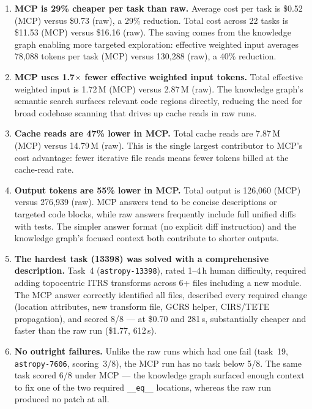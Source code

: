 \begin{enumerate}
\item \textbf{MCP is 29\% cheaper per task than raw.}
      Average cost per task is \$0.52 (MCP) versus \$0.73 (raw), a
      29\% reduction.  Total cost across 22 tasks is \$11.53 (MCP)
      versus \$16.16 (raw).  The saving comes from the knowledge graph
      enabling more targeted exploration: effective weighted input
      averages 78{,}088 tokens per task (MCP) versus 130{,}288 (raw),
      a 40\% reduction.

\item \textbf{MCP uses 1.7$\times$ fewer effective weighted input
      tokens.}
      Total effective weighted input is 1.72\,M (MCP) versus 2.87\,M
      (raw).  The knowledge graph's semantic search surfaces relevant
      code regions directly, reducing the need for broad codebase
      scanning that drives up cache reads in raw runs.

\item \textbf{Cache reads are 47\% lower in MCP.}
      Total cache reads are 7.87\,M (MCP) versus 14.79\,M (raw).
      This is the single largest contributor to MCP's cost advantage:
      fewer iterative file reads means fewer tokens billed at the
      cache-read rate.

\item \textbf{Output tokens are 55\% lower in MCP.}
      Total output is 126{,}060 (MCP) versus 276{,}939 (raw).
      MCP answers tend to be concise descriptions or targeted code
      blocks, while raw answers frequently include full unified diffs
      with tests.  The simpler answer format (no explicit diff
      instruction) and the knowledge graph's focused context both
      contribute to shorter outputs.

\item \textbf{The hardest task (13398) was solved with a comprehensive
      description.}
      Task~4 (\texttt{astropy-13398}), rated 1--4\,h human difficulty,
      required adding topocentric ITRS transforms across 6+ files
      including a new module.  The MCP answer correctly identified all
      files, described every required change (location attributes, new
      transform file, GCRS helper, CIRS/TETE propagation), and scored
      8/8 --- at \$0.70 and 281\,s, substantially cheaper and faster
      than the raw run (\$1.77, 612\,s).

\item \textbf{No outright failures.}
      Unlike the raw runs which had one fail (task~19,
      \texttt{astropy-7606}, scoring~3/8), the MCP run has no task
      below 5/8.  The same task scored 6/8 under MCP --- the knowledge
      graph surfaced enough context to fix one of the two required
      \texttt{\_\_eq\_\_} locations, whereas the raw run produced no
      patch at all.


\end{enumerate}
